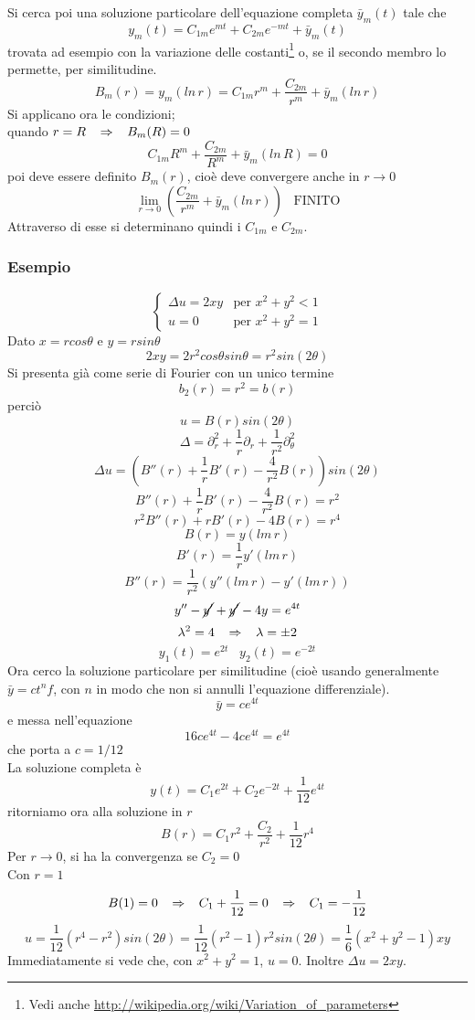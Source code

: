 Si cerca poi una soluzione particolare dell'equazione completa $\bar{y}_m(t)$
tale che
\[
	y_m(t)= C_{1m}e^{mt} + C_{2m}e^{-mt} + \bar{y}_m(t)
\]
trovata ad esempio con la variazione delle costanti\footnote{
Vedi anche \url{http://wikipedia.org/wiki/Variation_of_parameters}}
o, se il secondo membro lo permette, per similitudine.
\[
	B_m (r)= y_m(ln \, r) = C_{1m}r^m + \frac{C_{2m}}{r^m} + \bar{y}_m(ln \, r)
\]
Si applicano ora le condizioni;\\
quando $r=R \;\;\; \Rightarrow \;\;\; B_m (R)=0$
\[
	C_{1m}R^m + \frac{C_{2m}}{R^m} + \bar{y}_m(ln \, R)=0
\]
poi deve essere definito $B_m(r)$, cio\`e deve convergere anche in $r \to 0$
\[
	\lim_{r \to 0} \left(
	\frac{C_{2m}}{r^m} + \bar{y}_m(ln \, r) \right) \;\;\; \text{FINITO}
\]
Attraverso di esse si determinano quindi i $C_{1m}$ e $C_{2m}$.
\subsubsection{Esempio}
\[
	\left\{
	\begin{array}{ll}
		\Delta u= 2xy	& \text{per } x^2 +y^2 <1 \\
		u=0		& \text{per } x^2+y^2=1
	\end{array}
	\right.
\]
Dato $x= rcos \theta$ e $y= rsin\theta$
\[
	2xy= 2r^2 cos \theta sin \theta= r^2 sin(2\theta)
\]
Si presenta gi\`a come serie di Fourier con un unico termine
\[
	b_2(r)=r^2= b(r)
\]
perci\`o
\[
	u= B(r) sin(2\theta)
\]
\[
	\Delta = \partial_r^2 +\frac{1}{r}\partial_r + \frac{1}{r^2}\partial_{\theta}^2
\]
\[
	\Delta u= \left(
	B''(r) + \frac{1}{r} B' (r) - \frac{4}{r^2} B(r)
	\right) sin (2 \theta)
\]
\[
	B''(r) +\frac{1}{r}B'(r) - \frac{4}{r^2}B(r)= r^2
\]
\[
	r^2 B''(r) +rB'(r) - 4B(r)= r^4
\]
\[
	B(r)= y(lm \, r)
\]
\[
	B'(r)= \frac{1}{r}y'(lm \, r)
\]
\[
	B''(r)= \frac{1}{r^2}\left( y''(lm \, r) - y'(lm \, r) \right)
\]
\[
	y'' - \cancel{y'} + \cancel{y'} - 4y= e^{4t}
\]
\[
	\lambda^2=4 \;\;\; \Rightarrow \;\;\; \lambda=\pm 2
\]
\[
	y_1(t)= e^{2t} \;\;\; y_2(t)= e^{-2t}
\]
Ora cerco la soluzione particolare per similitudine (cio\`e usando
generalmente $\bar{y}= c t^n f$, con $n$ in modo che non si annulli 
l'equazione differenziale).
\[
	\bar{y}= c e^{4t}
\]
e messa nell'equazione
\[
	16ce^{4t} - 4ce^{4t}= e^{4t}
\]
che porta a $c= 1/12$\\
La soluzione completa \`e
\[
	y(t)= C_1e^{2t} + C_2e^{-2t} + \frac{1}{12}e^{4t}
\]
ritorniamo ora alla soluzione in $r$
\[
	B(r)= C_1 r^2 + \frac{C_2}{r^2} + \frac{1}{12}r^4
\]
Per $r \to 0$, si ha la convergenza se $C_2=0$\\
Con $r=1$
\[
	B(1)=0 \;\;\; \Rightarrow \;\;\; C_1+ \frac{1}{12}=0 \;\;\; \Rightarrow \;\;\; C_1= - \frac{1}{12}
\]
\[
	u= \frac{1}{12}(r^4 - r^2)sin(2 \theta)= \frac{1}{12}(r^2 -1)r^2 sin(2\theta) =
	\frac{1}{6}(x^2 + y^2 -1)xy
\]
Immediatamente si vede che, con $x^2 + y^2 =1$, $u=0$.
Inoltre $\Delta u= 2xy$.

